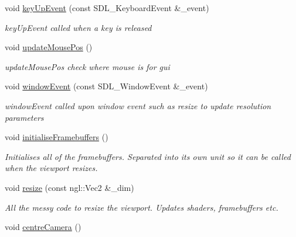 \begin{DoxyCompactItemize}
void \hyperlink{class_scene_a5a211a9ced3f0c52d898533fe5534269}{key\+Up\+Event} (const S\+D\+L\+\_\+\+Keyboard\+Event \&\+\_\+event)
\begin{DoxyCompactList}\small\item\em key\+Up\+Event called when a key is released \end{DoxyCompactList}\item 
\hypertarget{class_scene_affbeeb5ca9cc57ba94f73b5292e5e1fe}{}void \hyperlink{class_scene_affbeeb5ca9cc57ba94f73b5292e5e1fe}{update\+Mouse\+Pos} ()\label{class_scene_affbeeb5ca9cc57ba94f73b5292e5e1fe}

\begin{DoxyCompactList}\small\item\em update\+Mouse\+Pos check where mouse is for gui \end{DoxyCompactList}\item 
void \hyperlink{class_scene_a568509fe7dc4aa04ac22731f2eb9a4a0}{window\+Event} (const S\+D\+L\+\_\+\+Window\+Event \&\+\_\+event)
\begin{DoxyCompactList}\small\item\em window\+Event called upon window event such as resize to update resolution parameters \end{DoxyCompactList}\item 
\hypertarget{class_scene_af1f2fc30a45e73e85835c7b08aac45ca}{}void \hyperlink{class_scene_af1f2fc30a45e73e85835c7b08aac45ca}{initialise\+Framebuffers} ()\label{class_scene_af1f2fc30a45e73e85835c7b08aac45ca}

\begin{DoxyCompactList}\small\item\em Initialises all of the framebuffers. Separated into its own unit so it can be called when the viewport resizes. \end{DoxyCompactList}\item 
\hypertarget{class_scene_a8dd3993030da7b44743027c953590453}{}void \hyperlink{class_scene_a8dd3993030da7b44743027c953590453}{resize} (const ngl\+::\+Vec2 \&\+\_\+dim)\label{class_scene_a8dd3993030da7b44743027c953590453}

\begin{DoxyCompactList}\small\item\em All the messy code to resize the viewport. Updates shaders, framebuffers etc. \end{DoxyCompactList}\item 
\hypertarget{class_scene_a5c481d7867f659b06a444f918faeea45}{}void \hyperlink{class_scene_a5c481d7867f659b06a444f918faeea45}{centre\+Camera} ()\label{class_scene_a5c481d7867f659b06a444f918faeea45}


\end{DoxyCompactItemize}
